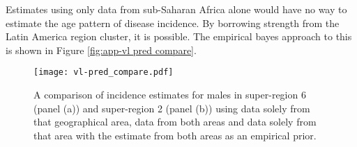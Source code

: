 Estimates using only data from sub-Saharan Africa alone would have no
way to estimate the age pattern of disease incidence. By borrowing
strength from the Latin America region cluster, it is possible.  The
empirical bayes approach to this is shown in Figure \ref{fig:app-vl
  pred compare}.

    \begin{figure}[h]
        \begin{center}
            \texttt{[image: vl-pred\_compare.pdf]}
            \caption{A comparison of incidence estimates for males in
              super-region 6 (panel (a)) and super-region 2 (panel
              (b)) using data solely from that geographical area, data
              from both areas and data solely from that area with the
              estimate from both areas as an empirical prior.}
            \label{fig:app-vl pred compare}
        \end{center}
    \end{figure} 
